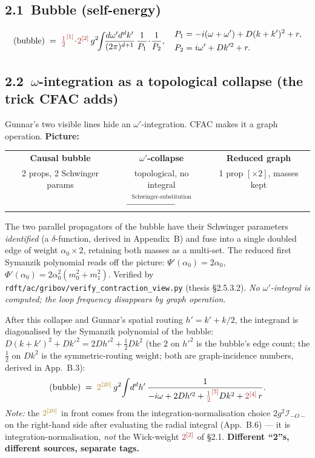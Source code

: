 \documentclass[11pt,a4paper]{article}
\newcommand{\cv}[2]{{\color{cntcol}{#2}^{[#1]}}}   %
\newcommand{\iv}[2]{{\color{intcol}{#2}^{[#1]}}}   %
\newcommand{\bubblecausal}{%
\begin{tikzpicture}[baseline=-0.5ex,scale=1.0]
  \draw[thick,-{Stealth[length=2mm]}] (-1.5,0)--(-1.0,0);
  \draw[thick] (-1.0,0)--(-0.6,0);
  \draw[thick] (0,0) circle (0.6);
  \draw[thick] (0.6,0)--(1.0,0);
  \draw[thick,-{Stealth[length=2mm]}] (1.0,0)--(1.5,0);
  \filldraw[black] (-0.6,0) circle (0.07);
  \filldraw[black] ( 0.6,0) circle (0.07);
  \node at (0,0.85) {\scriptsize $\omega+\omega'$};
  \node at (0,-0.85) {\scriptsize $\omega'$};
  \node at (0,0.30) {\tiny $\alpha_{1}$};
  \node at (0,-0.30) {\tiny $\alpha_{2}$};
\end{tikzpicture}}
\newcommand{\bubblereduced}{%
\begin{tikzpicture}[baseline=-0.5ex,scale=1.0]
  \draw[thick,-{Stealth[length=2mm]}] (-1.5,0)--(-1.0,0);
  \draw[thick] (-1.0,0)--(-0.05,0);
  \draw[thick] (0.05,0)--(1.0,0);
  \draw[thick,-{Stealth[length=2mm]}] (1.0,0)--(1.5,0);
  \draw[ultra thick,cntcol!70!black] (0,0) .. controls (-0.7,0.95) and (0.7,0.95) .. (0,0);
  \filldraw[black] (0,0) circle (0.07);
  \node[cntcol!50!black] at (0,1.05) {\scriptsize $\alpha_{0}\;[\times 2]$};
  \node at (0,-0.30) {\scriptsize masses $\{m_{0},m_{1}\}$};
\end{tikzpicture}}
\begin{document}
\subsection*{2.1\ Bubble (self-energy)}
\[
\text{(bubble)}
\;=\; \cv{1}{\tfrac{1}{2}}\!\cdot\! \cv{2}{2}\, g^{2}\!\!\int\!\!\frac{d\omega' d^{d}k'}{(2\pi)^{d+1}}\,
\frac{1}{P_{1}}\!\cdot\!\frac{1}{P_{2}},
\quad
\begin{aligned}
P_{1} &= -i(\omega+\omega')+D(k+k')^{2}+r,\\
P_{2} &= i\omega'+Dk'^{2}+r.
\end{aligned}
\]

\subsection*{2.2\ $\omega$-integration as a topological collapse (the trick CFAC adds)}

Gunnar's two visible lines hide an $\omega'$-integration. CFAC makes it a graph operation.
\textbf{Picture:}

\begin{center}
\begin{tabular}{@{}c@{\quad}c@{\quad}c@{}}
\textbf{Causal bubble} & \textbf{$\omega'$-collapse} & \textbf{Reduced graph} \\[1pt]
\footnotesize 2 props, 2 Schwinger params & \footnotesize topological, no integral & \footnotesize 1 prop $[\times 2]$, masses kept \\[3pt]
\bubblecausal &
$\xrightarrow{\;\;\;\text{Schwinger-substitution}\;\;\;}$ &
\bubblereduced \\
\end{tabular}
\end{center}

\noindent The two parallel propagators of the bubble have their Schwinger parameters
\emph{identified} (a $\delta$-function, derived in Appendix~B) and fuse into a single
doubled edge of weight $\alpha_{0}\!\times\!2$, retaining both masses as a multi-set.
The reduced first Symanzik polynomial reads off the picture:
$\Psi'(\alpha_{0}) = 2\alpha_{0}$, $\Phi'(\alpha_{0}) = 2\alpha_{0}^{2}(m_{0}^{2}+m_{1}^{2})$.
Verified by \texttt{rdft/ac/gribov/verify\_contraction\_view.py} (thesis \S 2.5.3.2).
\emph{No $\omega'$-integral is computed; the loop frequency disappears by graph
operation.}

After this collapse and Gunnar's spatial routing $h' = k'+k/2$, the integrand is
diagonalised by the Symanzik polynomial of the bubble: $D(k+k')^{2}+Dk'^{2} = 2Dh'^{2} + \tfrac{1}{2}Dk^{2}$
(the $2$ on $h'^{2}$ is the bubble's edge count; the $\tfrac{1}{2}$ on $Dk^{2}$ is the
symmetric-routing weight; both are graph-incidence numbers, derived in App.~B.3):
\[
\text{(bubble)} \;=\; \iv{20}{2}\,g^{2}\!\int\! d^{d}h'\,
\frac{1}{-i\omega + 2Dh'^{2} + \cv{3}{\tfrac{1}{2}}Dk^{2} + \cv{4}{2}\,r}.
\]
\emph{Note:} the $\iv{20}{2}$ in front comes from the integration-normalisation choice
$2g^{2}\mathcal{I}_{-O-}$ on the right-hand side after evaluating the radial integral
(App.~B.6) --- it is integration-normalisation, \emph{not} the Wick-weight $\cv{2}{2}$ of
\S 2.1. \textbf{Different ``2''s, different sources, separate tags.}
\end{document}
